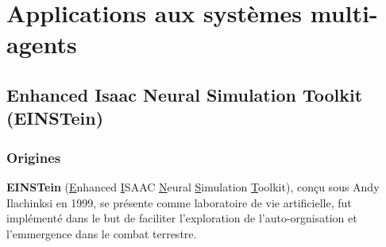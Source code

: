 \documentclass{article}
\begin{document}
\section{Applications aux systèmes multi-agents}

\subsection{Enhanced Isaac Neural Simulation Toolkit (EINSTein)}

\subsubsection{Origines}
\textbf{EINSTein} (\underline{E}nhanced \underline{I}SAAC \underline{N}eural \underline{S}imulation \underline{T}oolkit), conçu sous Andy Ilachinksi en 1999, se présente comme \og{}laboratoire\fg{} de vie artificielle, fut implémenté dans le but de faciliter l'exploration de l'auto-orgnisation et l'emmergence dans le combat terrestre. 
\end{document}
